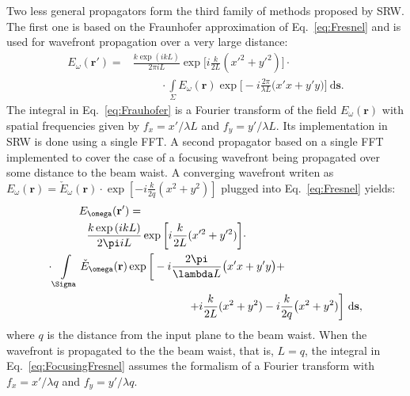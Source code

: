 \documentclass{iucr}              %
\begin{document}
Two less general propagators form the third family of methods proposed by SRW. The first one is based on the Fraunhofer approximation of Eq.~\ref{eq:Fresnel} and is used for wavefront propagation over a very large distance:
 \begin{equation}\label{eq:Frauhofer}
\begin{split}
    E_\omega(\textbf{r}') = &\frac{k\exp{(ikL)}}{2\pi i L}\exp{\bigg[i\frac{k}{2L}(x'^2 + y'^2)\bigg]}\cdot \\
    &\enspace\qquad\cdot\int\limits_{\Sigma}{E_\omega(\textbf{r})\exp{\bigg[-i \frac{2\pi}{\lambda L}\big( x'x + y'y \big)\bigg]}~\mathrm{d}\textbf{s}}.
\end{split}
\end{equation}
The integral in Eq.~\ref{eq:Frauhofer} is a Fourier transform of the field $E_\omega(\textbf{r})$ with spatial frequencies given by $f_x=x'/\lambda L$ and $f_y=y'/\lambda L$. Its implementation in SRW is done using a single FFT. A second propagator based on a single FFT implemented to cover the case of a focusing wavefront being propagated over some distance to the beam waist. A converging wavefront writen as $E_\omega(\textbf{r}) = \check E_\omega(\textbf{r})\cdot\exp{[-i\frac{k}{2q}(x^2 + y^2)]}$ plugged into Eq.~\ref{eq:Fresnel} yields:
 \begin{equation}\label{eq:FocusingFresnel}
\begin{split}
    E_\omega(\textbf{r}') = \qquad\qquad\qquad\qquad\qquad\qquad\qquad\qquad\qquad\qquad &\\
    \frac{k\exp{(ikL)}}{2\pi i L}\exp{\bigg[i\frac{k}{2L}(x'^2 + y'^2)\bigg]}\cdot \qquad\qquad\qquad\qquad\qquad\enspace &\\
    \cdot\int\limits_{\Sigma}{\check E_\omega(\textbf{r})\exp{\bigg[-i \frac{2\pi}{\lambda L}\big( x'x + y'y \big) +}} \qquad\qquad\qquad\quad&\\
    \hfill+i\frac{k}{2L}(x^2 + y^2) - i \frac{k}{2 q}\big(x^2+y^2) \bigg]~\mathrm{d}\textbf{s},&
\end{split}
\end{equation}
where $q$ is the distance from the input plane to the beam waist. When the wavefront is propagated to the the beam waist, that is, $L=q$, the integral in Eq.~\ref{eq:FocusingFresnel} assumes the formalism of a Fourier transform with $f_x=x'/\lambda q$ and $f_y=y'/\lambda q$. 
\end{document}
